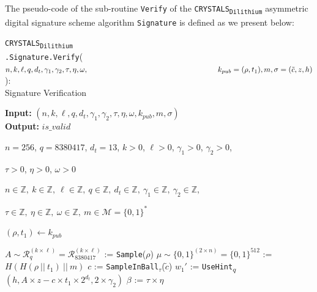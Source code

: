 \documentclass[runningheads]{llncs}
\numberwithin{equation}{section}
\begin{document}
    \noindent The pseudo-code of the sub-routine \texttt{Verify} of the \texorpdfstring{\texttt{CRYSTALS}\textsubscript{\texttt{Dilithium}}}\/ asymmetric digital signature scheme algorithm \texttt{Signature} is defined as we present below:
    \vspace{-3.75ex}
    \begin{algorithm}
        \caption{\texorpdfstring{\texttt{CRYSTALS}\textsubscript{\texttt{Dilithium}}\\ \phantom{............................}\texttt{.Signature}\texttt{.Verify}($n, k, \ell, q, {d}_{t}, {\gamma}_{1}, {\gamma}_{2}, \tau, \eta, \omega,\\ \phantom{..............................................................}{k}_{pub} = (\rho, {t}_{1}), m, \sigma=(\tilde{c},z,h)$)}\/:\\ \phantom{....................................................................................}Signature Verification}
        \label{subrou:crystals-dilithium-verify}
        
        \textbf{Input:} $\left( n, k, \ell, q, {d}_{t}, {\gamma}_{1}, {\gamma}_{2}, \tau, \eta, \omega, {k}_{pub}, m, \sigma \right)$\\
        \textbf{Output:} $ is\_valid $
    
        \begin{algorithmic}[1]
            \Require \begin{varwidth}[t]{\linewidth}$n = 256$, $q = 8380417$, ${d}_{t} = 13$, $k > 0$, $\ell > 0$, ${\gamma}_{1} > 0$, ${\gamma}_{2} > 0$,\par $\tau > 0$, $\eta > 0$, $\omega > 0$ \end{varwidth}
            \Ensure \begin{varwidth}[t]{\linewidth}$n \in \mathbb{Z},\ k \in \mathbb{Z},\ \ell \in \mathbb{Z},\ q \in \mathbb{Z},\ {d}_{t} \in \mathbb{Z},\ {\gamma}_{1} \in \mathbb{Z},\ {\gamma}_{2} \in \mathbb{Z},$\par $\tau \in \mathbb{Z},\ \eta \in \mathbb{Z},\ \omega \in \mathbb{Z},\ m \in \mathcal{M} = {\{0, 1\}}^{*}$ \end{varwidth}
            
            \vspace{2ex}

            \State $\left( \rho, {t}_{1} \right) \gets {k}_{pub}$
            
            \vspace{1ex}
            
            \State $A \sim {\mathcal{R}}_{q}^{( k \times \ell )} = {\mathcal{R}}_{8380417}^{( k \times \ell )}$ := \texttt{Sample}($\rho$)
            \State $\mu \sim { \{ 0 , 1 \} }^{( 2 \times n )} = { \{ 0 , 1 \} }^{512}$ := $H\left( H( \rho\ ||\ {t}_{1} )\ ||\ m \right)$
            \State $c$ := \texttt{SampleInBall}${}_{\tau}$($\tilde{c}$)
            \State ${w}_{1}'$ := \texttt{UseHint}\textsubscript{$q$}$( h, A \times z - c \times {t}_{1} \times {2}^{{d}_{t}}, 2 \times {\gamma}_{2} )$
            \State $\beta$ := $\tau \times \eta$


\end{algorithmic}
\end{algorithm}
\end{document}
